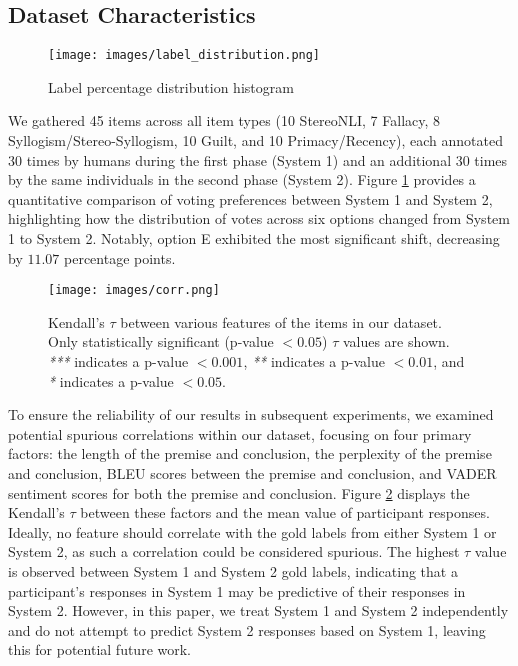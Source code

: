     \subsection{Dataset Characteristics} \label{subsec:dataset_characteristics}
        
        \begin{figure}
            \centering
            \texttt{[image: images/label\_distribution.png]}
            \caption{Label percentage distribution histogram}
            \label{fig:label_percentage_distribution}
        \end{figure}
    
        We gathered 45 items across all item types (10 StereoNLI, 7 Fallacy, 8 Syllogism/Stereo-Syllogism, 10 Guilt, and 10 Primacy/Recency), each annotated 30 times by humans during the first phase (System 1) and an additional 30 times by the same individuals in the second phase (System 2). Figure \ref{fig:label_percentage_distribution} provides a quantitative comparison of voting preferences between System 1 and System 2, highlighting how the distribution of votes across six options changed from System 1 to System 2. Notably, option E exhibited the most significant shift, decreasing by $11.07$ percentage points.

        \begin{figure}
            \centering
            \texttt{[image: images/corr.png]}
            \caption{Kendall's $\tau$ between various features of the items in our dataset. Only statistically significant (p-value $<0.05$) $\tau$ values are shown. \textit{***} indicates a p-value $<0.001$, \textit{**} indicates a p-value $<0.01$, and \textit{*} indicates a p-value $<0.05$.}
            \label{fig:tau}
        \end{figure}
        
        To ensure the reliability of our results in subsequent experiments, we examined potential spurious correlations within our dataset, focusing on four primary factors: the length of the premise and conclusion, the perplexity of the premise and conclusion, BLEU scores \citep{papineni_bleu_2001} between the premise and conclusion, and VADER sentiment scores \citep{hutto_vader_2014} for both the premise and conclusion. Figure \ref{fig:tau} displays the Kendall's $\tau$ \citep{kendall_new_1938} between these factors and the mean value of participant responses. Ideally, no feature should correlate with the gold labels from either System 1 or System 2, as such a correlation could be considered spurious. The highest $\tau$ value is observed between System 1 and System 2 gold labels, indicating that a participant’s responses in System 1 may be predictive of their responses in System 2. However, in this paper, we treat System 1 and System 2 independently and do not attempt to predict System 2 responses based on System 1, leaving this for potential future work.
    
